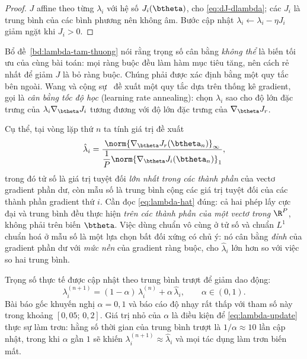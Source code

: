 \begin{proof}
$J$ affine theo từng $\lambda_i$ với hệ số $J_i(\btheta)$, cho
\eqref{eq:dJ-dlambda}; các $J_i$ là trung bình của các bình phương nên không âm.
Bước cập nhật $\lambda_i \gets \lambda_i - \eta J_i$ giảm ngặt khi $J_i > 0$.
\end{proof}
 
Bổ đề~\ref{bd:lambda-tam-thuong} nói rằng trọng số cân bằng \emph{không thể} là
biến tối ưu của cùng bài toán: mọi ràng buộc đều làm hàm mục tiêu tăng, nên cách
rẻ nhất để giảm $J$ là bỏ ràng buộc. Chúng phải được xác định bằng một quy tắc
bên ngoài. Wang và cộng sự~\cite{wang2021} đề xuất một quy tắc dựa trên thống kê
gradient, gọi là \emph{cân bằng tốc độ học} (learning rate annealing): chọn
$\lambda_{i}$ sao cho độ lớn đặc trưng của $\lambda_{i}\nabla_{\btheta} J_{i}$
tương đương với độ lớn đặc trưng của $\nabla_{\btheta} J_{r}$.
 
Cụ thể, tại vòng lặp thứ $n$ ta tính giá trị đề xuất
\begin{equation}
\hat{\lambda}_{i}
= \frac{\norm{\nabla_{\btheta} J_{r}(\btheta_{n})}_{\infty}}
       {\dfrac{1}{P}\norm{\nabla_{\btheta} J_{i}(\btheta_{n})}_{1}} ,
\label{eq:lambda-hat}
\end{equation}
trong đó tử số là giá trị tuyệt đối \emph{lớn nhất trong các thành phần} của
vectơ gradient phần dư, còn mẫu số là trung bình cộng các giá trị tuyệt đối của
các thành phần gradient thứ $i$. Cần đọc \eqref{eq:lambda-hat} đúng: cả hai phép
lấy cực đại và trung bình đều thực hiện \emph{trên các thành phần của một vectơ
trong $\R^P$}, không phải trên biến $\btheta$. Việc dùng chuẩn vô cùng ở tử số và
chuẩn $L^1$ chuẩn hoá ở mẫu số là một lựa chọn bất đối xứng có chủ ý: nó cân bằng
\emph{đỉnh} của gradient phần dư với \emph{mức nền} của gradient ràng buộc, cho
$\hat\lambda_i$ lớn hơn so với việc so hai trung bình.
 
Trọng số thực tế được cập nhật theo trung bình trượt để giảm dao động:
\begin{equation}
\lambda_{i}^{(n+1)}
= (1-\alpha)\, \lambda_{i}^{(n)}
+ \alpha\, \hat{\lambda}_{i},
\qquad \alpha \in (0,1).
\label{eq:lambda-update}
\end{equation}
Bài báo gốc khuyến nghị $\alpha = 0{,}1$ và báo cáo độ nhạy rất thấp với tham số
này trong khoảng $[0{,}05;\,0{,}2]$. Giá trị nhỏ của $\alpha$ là điều kiện để
\eqref{eq:lambda-update} thực sự làm trơn: hằng số thời gian của trung bình trượt
là $1/\alpha \approx 10$ lần cập nhật, trong khi $\alpha$ gần $1$ sẽ khiến
$\lambda_i^{(n+1)} \approx \hat\lambda_i$ và mọi tác dụng làm trơn biến mất.
 
